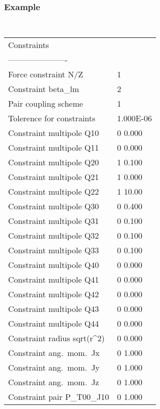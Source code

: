 \documentclass[a4paper,11pt]{article}
\begin{document}
\subsubsection*{Example}
\begin{center}
\tt
\begin{tabular}{|ll|}
\hline
Constraints                     &          \\
----------------------          &          \\
Force constraint N/Z            &1         \\
Constraint beta\_lm             &2         \\
Pair coupling scheme            &1         \\
Tolerence for constraints       &1.000E-06 \\
Constraint multipole Q10        &0 \phantom{0}0.000   \\
Constraint multipole Q11        &0 \phantom{0}0.000   \\
Constraint multipole Q20        &1 \phantom{0}0.100   \\
Constraint multipole Q21        &1 \phantom{0}0.000   \\
Constraint multipole Q22        &1 \phantom{0}10.00   \\
Constraint multipole Q30        &0 \phantom{0}0.400   \\
Constraint multipole Q31        &0 \phantom{0}0.100   \\
Constraint multipole Q32        &0 \phantom{0}0.100   \\
Constraint multipole Q33        &0 \phantom{0}0.100   \\
Constraint multipole Q40        &0 \phantom{0}0.000   \\
Constraint multipole Q41        &0 \phantom{0}0.000   \\
Constraint multipole Q42        &0 \phantom{0}0.000   \\
Constraint multipole Q43        &0 \phantom{0}0.000   \\
Constraint multipole Q44        &0 \phantom{0}0.000   \\
Constraint radius sqrt(r\^{}2)  &0 \phantom{0}0.000   \\
Constraint ang.\ mom.\ Jx       &0 \phantom{0}1.000   \\
Constraint ang.\ mom.\ Jy       &0 \phantom{0}1.000   \\
Constraint ang.\ mom.\ Jz       &0 \phantom{0}1.000   \\
Constraint pair P\_T00\_J10     &0 \phantom{0}1.000   \\

\end{tabular}
\end{center}
\end{document}
